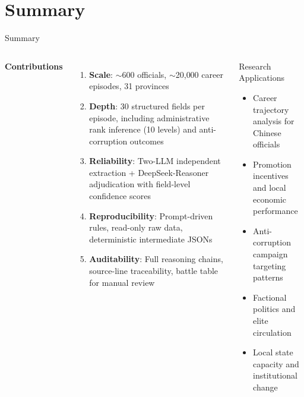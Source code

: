 \documentclass[aspectratio=169, 10pt]{beamer}
\begin{document}
\section{Summary}

\begin{frame}{Summary}
  \begin{columns}[T]
    \textbf{Contributions}
    \begin{enumerate}
      \item \textbf{Scale}: $\sim$600 officials, $\sim$20{,}000 career episodes, 31 provinces
      \item \textbf{Depth}: 30 structured fields per episode, including administrative rank inference (10 levels) and anti-corruption outcomes
      \item \textbf{Reliability}: Two-LLM independent extraction + DeepSeek-Reasoner adjudication with field-level confidence scores
      \item \textbf{Reproducibility}: Prompt-driven rules, read-only raw data, deterministic intermediate JSONs
      \item \textbf{Auditability}: Full reasoning chains, source-line traceability, battle table for manual review
    \end{enumerate}

    \begin{block}{Research Applications}
      \begin{itemize}
        \item Career trajectory analysis for Chinese officials
        \item Promotion incentives and local economic performance
        \item Anti-corruption campaign targeting patterns
        \item Factional politics and elite circulation
        \item Local state capacity and institutional change
      \end{itemize}
    \end{block}
  \end{columns}

\end{frame}

\appendix
\end{document}
